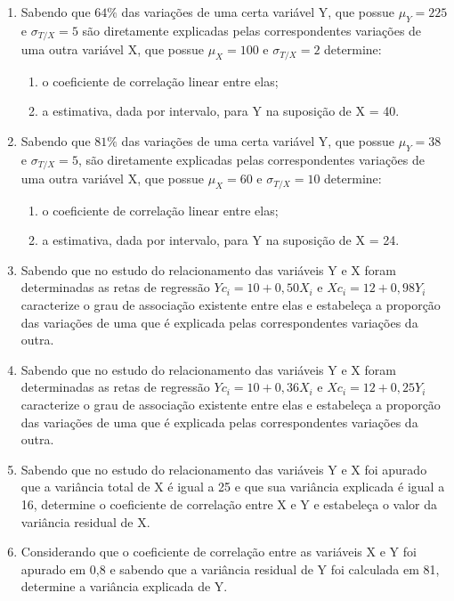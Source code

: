 \begin{enumerate}[resume]
\item Sabendo que $64\%$ das variações de uma certa variável Y, que possue $\mu_{Y} = 225$ e $\sigma_{T/X} = 5$ são diretamente explicadas pelas correspondentes variações de uma outra variável X, que possue $\mu_{X} = 100$ e $\sigma_{T/X} = 2 $ determine:
	\begin{enumerate}
	\item o coeficiente de correlação linear entre elas;
	\item a estimativa, dada por intervalo, para Y na suposição de X = 40.
	\end{enumerate}

\item Sabendo que $81\%$  das variações de uma certa variável Y, que possue $\mu_{Y}= 38$ e $\sigma_{T/X} = 5$, são diretamente explicadas pelas correspondentes variações de uma outra variável X, que possue $\mu_{X} = 60$ e $\sigma_{T/X} = 10 $ determine:
	\begin{enumerate}
	\item o coeficiente de correlação linear entre elas;
	\item a estimativa, dada por intervalo, para Y na suposição de X = 24.
	\end{enumerate}

\item Sabendo que no estudo do relacionamento das variáveis Y e X foram determinadas as retas de regressão $Yc_{i} = 10 + 0,50X_{i} $ e $Xc_{i} = 12 + 0,98Y_{i} $ caracterize o grau de associação existente entre elas e estabeleça a proporção das variações de uma que é explicada pelas correspondentes variações da outra.

\item Sabendo que no estudo do relacionamento das variáveis Y e X foram determinadas as retas de regressão $Yc_{i} = 10 + 0,36X_{i} $ e $Xc_{i} = 12 + 0,25Y_{i} $ caracterize o grau de associação existente entre elas e estabeleça a proporção das variações de uma que é explicada pelas correspondentes variações da outra.

\item Sabendo que no estudo do relacionamento das variáveis Y e X foi apurado que a variância total de X é igual a 25 e que sua variância explicada é igual a 16, determine o coeficiente de correlação entre X e Y e estabeleça o valor da variância residual de X.

\item Considerando que o coeficiente de correlação entre as variáveis X e Y foi apurado em 0,8 e sabendo que a variância residual de Y foi calculada em 81, determine a variância explicada de Y. 


\end{enumerate}
